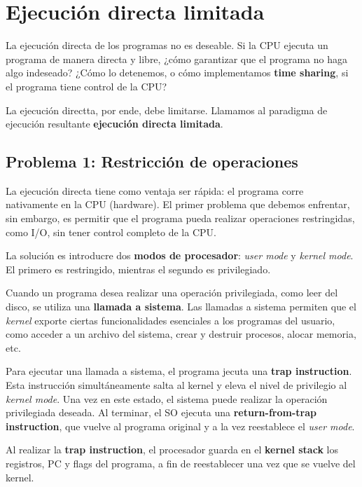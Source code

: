 \documentclass[12pt]{article}
\theoremstyle{definition}
\begin{document}
\pagebreak 

\section{Ejecución directa limitada}

La ejecución directa de los programas no es deseable. Si la CPU ejecuta un
programa de manera directa y libre, ¿cómo garantizar que el programa no haga
algo indeseado? ¿Cómo lo detenemos, o cómo implementamos \textbf{time sharing},
si el programa tiene control de la CPU? 

La ejecución directta, por ende, debe limitarse. Llamamos al paradigma de
ejecución resultante \textbf{ejecución directa limitada}. 

\subsection{Problema 1: Restricción de operaciones}

La ejecución directa tiene como ventaja ser rápida: el programa corre
nativamente en la CPU (hardware). El primer problema que debemos enfrentar, sin
embargo, es permitir que el programa pueda realizar operaciones restringidas,
como I/O, sin tener control completo de la CPU. 

La solución es introducre dos \textbf{modos de procesador}: \textit{user mode} y
\textit{kernel mode}. El primero es restringido, mientras el segundo es
privilegiado. 

Cuando un programa desea realizar una operación privilegiada, como leer del
disco, se utiliza una \textbf{llamada a sistema}. Las llamadas a sistema
permiten que el \textit{kernel} exporte ciertas funcionalidades esenciales a
los programas del usuario, como acceder a un archivo del sistema, crear y
destruir procesos, alocar memoria, etc. 

Para ejecutar una llamada a sistema, el programa jecuta una \textbf{trap
instruction}. Esta instrucción simultáneamente salta al kernel y eleva el nivel
de privilegio al \textit{kernel mode}. Una vez en este estado, el sistema puede
realizar la operación privilegiada deseada. Al terminar, el SO ejecuta una
\textbf{return-from-trap instruction}, que vuelve al programa original y a la
vez reestablece el \textit{user mode}.

Al realizar la \textbf{trap instruction}, el procesador guarda en el
\textbf{kernel stack} los registros, PC y flags del programa, a fin de
reestablecer una vez que se vuelve del kernel.
\end{document}
